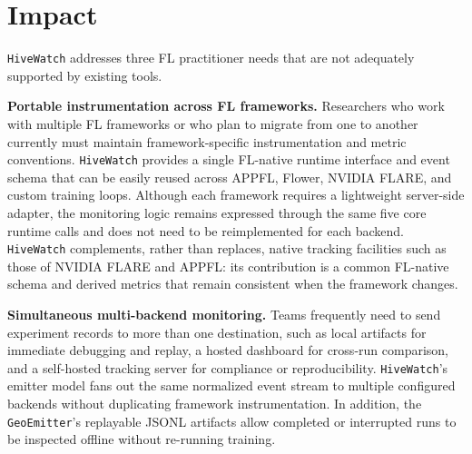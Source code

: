 \documentclass[preprint,12pt, a4paper]{elsarticle}
\newcommand{\rev}[1]{{\color{blue}#1}}
\newcommand{\rev}[1]{#1}
\newcommand{\zl}[1]{{\textcolor{blue}{Check: #1}}}
\begin{document}


\section{Impact}
\label{sec:impact}
\texttt{HiveWatch} addresses three FL practitioner needs that are not adequately supported by existing tools.

\textbf{Portable instrumentation across FL frameworks.} Researchers who work with multiple FL frameworks or who plan to migrate from one to another currently must maintain framework-specific instrumentation and metric conventions. \texttt{HiveWatch} provides a single FL-native runtime interface and event schema that can be easily reused across APPFL, Flower, NVIDIA FLARE, and custom training loops. Although each framework requires a lightweight server-side adapter, the monitoring logic remains expressed through the same five core runtime calls and does not need to be reimplemented for each backend. \rev{\texttt{HiveWatch} complements, rather than replaces, native tracking facilities such as those of NVIDIA FLARE and APPFL: its contribution is a common FL-native schema and derived metrics that remain consistent when the framework changes.}

\textbf{Simultaneous multi-backend monitoring.} Teams frequently need to send experiment records to more than one destination, such as local artifacts for immediate debugging and replay, a hosted dashboard for cross-run comparison, and a self-hosted tracking server for compliance or reproducibility. \texttt{HiveWatch}'s emitter model fans out the same normalized event stream to multiple configured backends without duplicating framework instrumentation. In addition, the \texttt{GeoEmitter}'s replayable JSONL artifacts allow completed or interrupted runs to be inspected offline without re-running training.
\end{document}
